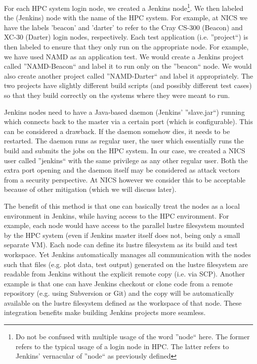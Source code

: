 \documentclass[10pt, conference, compsocconf]{IEEEtran}
\begin{document}
For each HPC system login node, we created a Jenkins node\footnote{Do not be confused with multiple usage of the word ''node`` here. 
The former refers to the typical usage of a login node in HPC. 
The latter refers to Jenkins' vernacular of ''node`` as previously defined}. 
We then labeled the (Jenkins) node with the name of the HPC system. 
For example, at NICS we have the labels 'beacon' and 'darter' to refer to the Cray CS-300 (Beacon) and XC-30 (Darter) login nodes, respectively. 
Each test application (i.e. ''project``) is then labeled to ensure that they only run on the appropriate node. 
For example, we have used NAMD \cite{namd} as an application test. 
We would create a Jenkins project called ''NAMD-Beacon`` and label it to run only on the ''beacon`` node. 
We would also create another project called ''NAMD-Darter`` and label it appropriately. 
The two projects have slightly different build scripts (and possibly different test cases) so that they build correctly on the systems where they were meant to run.

Jenkins nodes need to have a Java-based daemon (Jenkins' ''slave.jar``) running which connects back to the master via a certain port (which is configurable). 
This can be considered a drawback. 
If the daemon somehow dies, it needs to be restarted. 
The daemon runs as regular user, the user which essentially runs the build and submits the jobs on the HPC system. 
In our case, we created a NICS user called ''jenkins`` with the same privilege as any other regular user. 
Both the extra port opening and the daemon itself may be considered as attack vectors from a security perspective. 
At NICS however we consider this to be acceptable because of other mitigation (which we will discuss later).

The benefit of this method is that one can basically treat the nodes as a local environment in Jenkins, while having access to the HPC environment. 
For example, each node would have access to the parallel lustre filesystem mounted by the HPC system (even if Jenkins master itself does not, being only a small separate VM). 
Each node can define its lustre filesystem as its build and test workspace. 
Yet Jenkins automatically manages all communication with the nodes such that files (e.g. plot data, test output) generated on the lustre filesystem are readable from Jenkins without the explicit remote copy (i.e. via SCP). 
Another example is that one can have Jenkins checkout or clone code from a remote repository (e.g. using Subversion or Git) and the copy will be automatically available on the lustre filesystem defined as the workspace of that node. 
These integration benefits make building Jenkins projects more seamless.
\end{document}
